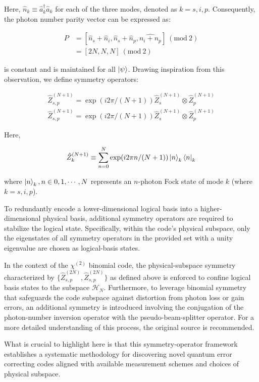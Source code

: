 \documentclass[11pt]{article}
\newcommand\0{\mathbf{0}}
\newcommand\<{\langle}
\renewcommand\>{\rangle}
\renewcommand\mod[1]{\ (\mathrm{mod}\ #1)}
\begin{document}
Here, $\hat{n}_k \equiv \hat{a}_k^\dag\hat{a}_k$ for each of the three modes, denoted as $k = s, i, p$. Consequently, the photon number parity vector can be expressed as:

\begin{align*}
P &= [\hat{n}_s + \hat{n}_i, \hat{n}_s + \hat{n}_p, \hat{n_i + n_p}  ] \mod 2\\
&= [2N, N, N] \mod 2
\end{align*}

is constant and is maintained for all $\ket{\psi}$. Drawing inspiration from this observation, we define symmetry operators:

\begin{align*}
\hat{Z}_{s, p}^{(N + 1)} = \exp(i 2 \pi / (N+1))	\hat{Z}_{s}^{(N + 1)} \otimes \hat{Z}_{p}^{(N + 1)} \\
\hat{Z}_{s, p}^{(N + 1)} = \exp(i 2 \pi / (N+1))	\hat{Z}_{s}^{(N + 1)} \otimes \hat{Z}_{p}^{(N + 1)}
\end{align*}

Here,

\begin{align*}
\hat{Z}_{k}^{(N + 1)} \equiv \sum_{n=0}^{N}\exp(i 2 \pi n / (N+1))	\ket{n}_k \bra{n}_k
\end{align*}

where $\ket{n}_k, n \in 0, 1, \cdots, N$ represents an $n$-photon Fock state of mode $k$ (where $k = s, i, p$).

To redundantly encode a lower-dimensional logical basis into a higher-dimensional physical basis, additional symmetry operators are required to stabilize the logical state. Specifically, within the code's physical subspace, only the eigenstates of all symmetry operators in the provided set with a unity eigenvalue are chosen as logical-basis states.

In the context of the $\chi^{(2)}$ binomial code, the physical-subspace symmetry characterized by $\{ \hat{Z}_{s, p}^{(2N)}, \hat{Z}_{s, p}^{(2N)}\}$ as defined above is enforced to confine logical basis states to the subspace $\mathcal{H}_N$. Furthermore, to leverage binomial symmetry that safeguards the code subspace against distortion from photon loss or gain errors, an additional symmetry is introduced involving the conjugation of the photon-number inversion operator with the pseudo-beam-splitter operator. For a more detailed understanding of this process, the original source \cite{niu2018hardware} is recommended.

What is crucial to highlight here is that this symmetry-operator framework establishes a systematic methodology for discovering novel quantum error correcting codes aligned with available measurement schemes and choices of physical subspace.
\end{document}
